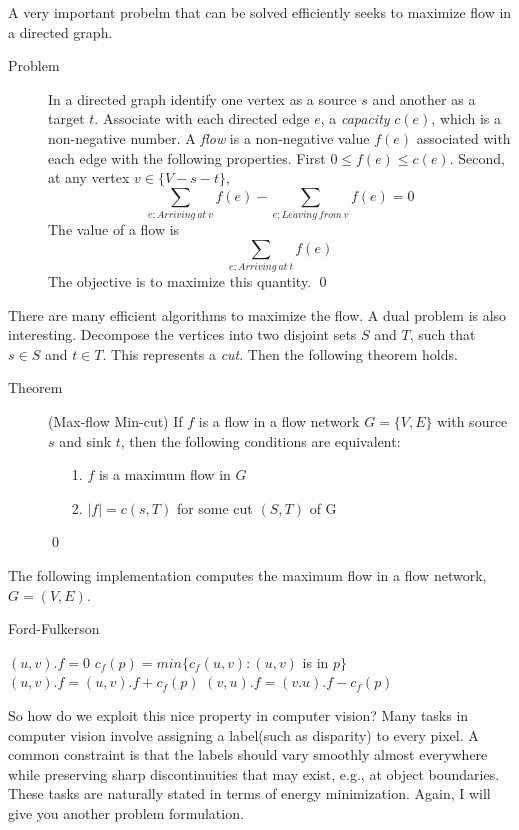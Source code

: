 \documentclass[openany]{memoir}
\begin{document}
A very important probelm that can be solved efficiently seeks to maximize flow in a directed graph.
\begin{description}
\item[Problem] In a directed graph identify one vertex as a source $s$ and another as a target $t$. Associate with each directed edge $e$, a \textit{capacity} $c(e)$, which is a non-negative number. A \textit{flow} is a non-negative value $f(e)$ associated with each edge with the following properties. First $0 \leq f(e) \leq c(e)$. Second, at any vertex $v \in \{V-s-t\}$,
$$\sum_{e;Arriving\ at\ v}f(e) - \sum_{e; Leaving\ from\ v}f(e) = 0$$
The value of a flow is
$$\sum_{e;Arriving\ at\ t}f(e)$$
The objective is to maximize this quantity. \qed
\end{description}

There are many efficient algorithms to maximize the flow. A dual problem is also interesting. Decompose the vertices into two disjoint sets $S$ and $T$, such that $s \in S$ and $t \in T$. This represents a \textit{cut}. Then the following theorem holds.

\begin{description}
\item[Theorem](Max-flow Min-cut) If $f$ is a flow in a flow network $G = \{V, E\}$ with source $s$ and sink $t$, then the following conditions are equivalent:
\begin{itemize}
\item[1.] $f$ is a maximum flow in $G$
\item[2.] $|f| = c(s, T)$ for some cut $(S, T)$ of G
\end{itemize} \qed
\end{description}

The following implementation computes the maximum flow in a flow network, $G=(V,E)$.

\begin{algorithm}
\caption{Ford-Fulkerson}
\begin{algorithmic}[1]
\STATE $(u,v).f = 0$
\ENDFOR
{}
\STATE $c_f(p) = min\{c_f(u,v) : (u,v)$ is in $p\}$
\STATE $(u,v).f = (u,v).f + c_f(p)$
\ELSE
\STATE $(v,u).f = (v.u).f - c_f(p)$
\ENDIF
\ENDFOR
\ENDWHILE
\end{algorithmic}
\end{algorithm}

So how do we exploit this nice property in computer vision? Many tasks in computer vision involve assigning a label(such as disparity) to every pixel. A common constraint is that the labels should vary smoothly almost everywhere while preserving sharp discontinuities that may exist, e.g., at object boundaries. These tasks are naturally stated in terms of energy minimization. Again, I will give you another problem formulation.
\end{document}
